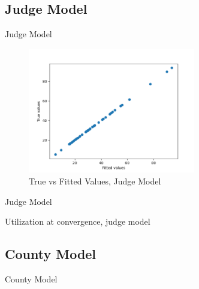 \documentclass[11pt]{article}
\begin{document}
  \subsection{Judge Model}

    \begin{table}[H]
      \centering
      \caption{Judge Model}
      
    \end{table}

    \begin{figure}[H]
      \centering
      \includegraphics[width=0.65\textwidth]{../../../output/figures/Exploration/fit_utilization_JudgeID}
      \caption{True vs Fitted Values, Judge Model}
    \end{figure}

    \begin{table}[H]
      \centering
      \caption{Judge Model}
      
    \end{table}

    \begin{table}[H]
      \centering
      \small
      \caption{Utilization at convergence, judge model}
      
    \end{table}

  \subsection{County Model}

    \begin{table}[H]
      \centering
      \caption{County Model}
      
    \end{table}
\end{document}
